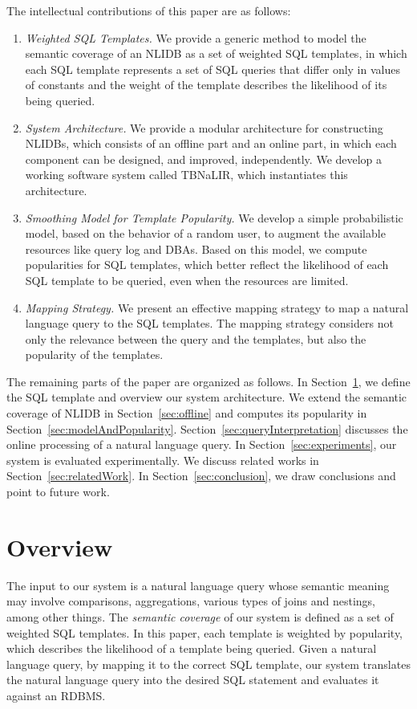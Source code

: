 \documentclass{vldb}
\begin{document}
The intellectual contributions of this paper are as follows: 
\begin{enumerate}
  \item \emph{Weighted SQL Templates.}  We provide a generic method to model the semantic coverage of an NLIDB as a set of weighted SQL templates, in which each SQL template represents a set of SQL queries that differ only in values of constants and the weight of the template describes the likelihood of its being queried.  
   \item \emph{System Architecture.}  We provide a modular architecture for constructing NLIDBs, which consists of an offline part and an online part, in which each component can be designed, and improved, independently.  We develop a working software system called TBNaLIR, which instantiates this architecture. 
  \item \emph{Smoothing Model for Template Popularity.}  We develop a simple probabilistic model,  based on the behavior of a random user, to augment the available resources like query log and DBAs.  Based on this model, we compute popularities for SQL templates, which better reflect the likelihood of each SQL template to be queried, even when the resources are limited.  
  \item \emph{Mapping Strategy.}  We present an effective mapping strategy to map a natural language query to the SQL templates.  The mapping strategy considers not only the relevance between the query and the templates, but also the popularity of the templates.  
\end{enumerate}

The remaining parts of the paper are organized as follows.  In Section~\ref{sec:overview}, we define the SQL template and overview our system architecture.  We extend the semantic coverage of NLIDB in Section~\ref{sec:offline} and computes its popularity in Section~\ref{sec:modelAndPopularity}.  Section~\ref{sec:queryInterpretation} discusses the online processing of a natural language query.  In Section~\ref{sec:experiments}, our system is evaluated experimentally.  We discuss related works in Section~\ref{sec:relatedWork}. In Section~\ref{sec:conclusion}, we draw conclusions and point to future work.

\section{Overview}
\label{sec:overview}
The input to our system is a natural language query whose semantic meaning may involve comparisons, aggregations, various types of joins and nestings, among other things.  The {\em semantic coverage} of our system is defined as a set of weighted SQL templates.  In this paper, each template is weighted by popularity, which describes the likelihood of a template being queried.  Given a natural language query, by mapping it to the correct SQL template, our system translates the natural language query into the desired SQL statement and evaluates it against an RDBMS.  
\end{document}
